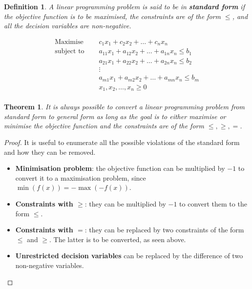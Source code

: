 \documentclass[preview,border=12pt,varwidth]{report}
\newtheorem{theorem}{Theorem}
\newtheorem{definition}{Definition}
\begin{document}
\begin{definition}
    A linear programming problem is said to be in \textbf{standard form} if the objective function is to be maximised, the constraints are of the form $\leq$, and all the decision variables are non-negative.

    \begin{align*}
        \text{Maximise }   \quad & c_1x_1 + c_2x_2 + \ldots + c_nx_n                       \\
        \text{subject to } \quad & a_{11} x_1 + a_{12} x_2 + \ldots + a_{1n} x_n  \leq b_1 \\
                                 & a_{21} x_1 + a_{22} x_2 + \ldots + a_{2n} x_n \leq b_2  \\
                                 & \vdots                                                  \\
                                 & a_{m1} x_1 + a_{m2} x_2 + \ldots + a_{mn} x_n  \leq b_m \\
                                 & x_1, x_2, \ldots, x_n \geq 0                            \\
    \end{align*}
\end{definition}

\begin{theorem}
    It is always possible to convert a linear programming problem from standard form to general form as long as the goal is to either maximise or minimise the objective function and the constraints are of the form $\le, \ge, =$.
\end{theorem}
\begin{proof}
    It is useful to enumerate all the possible violations of the standard form and how they can be removed.
    \begin{itemize}
        \item \textbf{Minimisation problem}: the objective function can be multiplied by $-1$ to convert it to a maximisation problem, since $\min(f(x)) = -\max(-f(x))$.
        \item \textbf{Constraints with $\geq$}: they can be multiplied by $-1$ to convert them to the form $\leq$.
        \item \textbf{Constraints with $=$}: they can be replaced by two constraints of the form $\leq$ and $\geq$.
              The latter is to be converted, as seen above.
        \item \textbf{Unrestricted decision variables} can be replaced by the difference of two non-negative variables.
    \end{itemize}
\end{proof}
\end{document}
